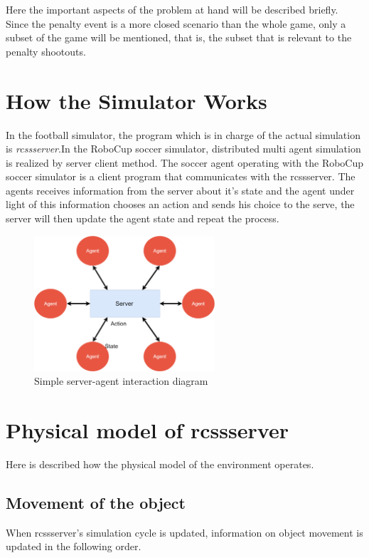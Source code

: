 Here the important aspects of the problem at hand will be described briefly. Since the penalty event is a more closed scenario than the whole game, only a subset of the game will be mentioned, that is, the subset that is relevant to the penalty shootouts.
\section{How the Simulator Works}
In the football simulator, the program which is in charge of the actual simulation is
\textit{rcssserver}.In the RoboCup soccer simulator, distributed multi agent simulation is realized by
server client method. The soccer agent operating with the RoboCup soccer simulator is a client program that communicates with the rcssserver. The agents receives information from the server about it's state and the agent under light of this information chooses an action and sends his choice to the serve, the server will then update the agent state and repeat the process.

\begin{figure}[h]
	\centering
	\includegraphics[width=0.6\textwidth]{Cap2/ServerAgent.png}
	\caption{Simple server-agent interaction diagram}
	\label{ServerAgent}
\end{figure}

\section{Physical model of rcssserver}

Here is described how the physical model of the  environment operates.

\subsection{Movement of the object}

When rcssserver's simulation cycle is updated, information on object movement is
updated in the following order.

